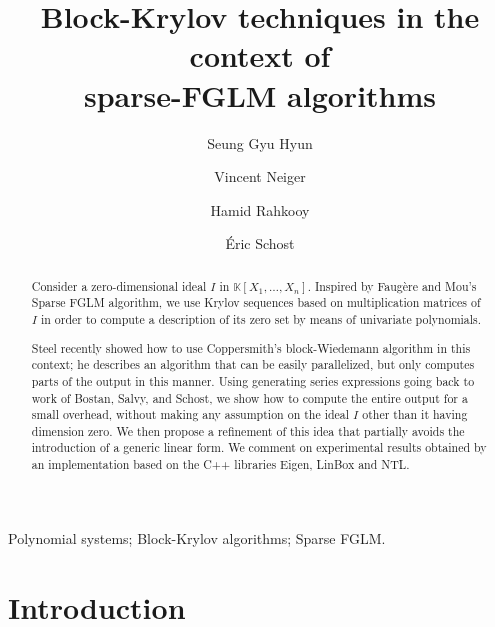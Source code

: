 \documentclass[final,1p,times,authoryear]{elsarticle}
\def\K{\mathbb{K}}
\def\K {\ensuremath{\mathbb{K}}}
\begin{document}
\begin{frontmatter}

  \title{Block-Krylov techniques in the context of \\ sparse-FGLM algorithms}

  \author{Seung Gyu Hyun}
  \address{Cheriton School of Computer Science, University of Waterloo}

  \author{Vincent Neiger}
  \address{Univ.~Limoges, CNRS, XLIM, UMR 7252, F-87000 Limoges, France}

  \author{Hamid Rahkooy}
  \address{Cheriton School of Computer Science, University of Waterloo}

  \author{\'Eric Schost}
  \address{Cheriton School of Computer Science, University of Waterloo}

  \begin{abstract}
    Consider a zero-dimensional ideal $I$ in $\K[X_1,\dots,X_n]$.  Inspired by
    Faug\`ere and Mou's Sparse FGLM algorithm,
    we use Krylov sequences based on multiplication matrices of $I$ in order to
    compute a description of its zero set by means of univariate polynomials.

    Steel recently showed how to use Coppersmith's block-Wiedemann algorithm in
    this context; he describes an algorithm that can be easily parallelized, but
    only computes parts of the output in this manner. Using generating series
    expressions going back to work of Bostan, Salvy, and Schost, we show how to
    compute the entire output for a small overhead, without making any assumption
    on the ideal $I$ other than it having dimension zero. We then propose a refinement of this idea that partially
    avoids the introduction of a generic linear form.  We comment on experimental
    results obtained by an implementation based on the C++ libraries Eigen, LinBox and
    NTL.
  \end{abstract}

  \begin{keyword}
    Polynomial systems; Block-Krylov algorithms; Sparse FGLM.
  \end{keyword}

\end{frontmatter}


\section{Introduction}
\end{document}
